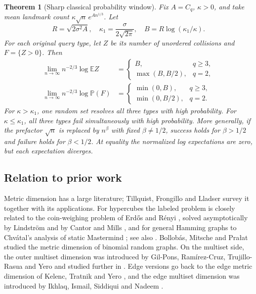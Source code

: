 \documentclass[11pt]{article}
\newtheorem{theorem}{Theorem}
\theoremstyle{definition}
\newcommand{\prob}{\mathbb P}
\newcommand{\ex}{\mathbb E}
\newcommand{\whp}{with high probability}
\begin{document}
\begin{theorem}[Sharp classical probability window]\label{thm:window}
Fix \(A=C_q\), \(\kappa>0\), and take mean landmark count \(\kappa\sqrt n\,e^{A n^{1/3}}\). Let
\[
R=\sqrt{2\sigma^2 A},\quad \kappa_1=\frac{\sigma}{2\sqrt{2\pi}},
\quad B=R\log(\kappa_1/\kappa).
\]
For each original query type, let \(Z\) be its number of unordered collisions and \(F=\{Z>0\}\). Then
\[
\begin{aligned}
\lim_{n\to\infty}n^{-2/3}\log\ex Z&=
\begin{cases}B,&q\ge3,\\ \max(B,B/2),&q=2,\end{cases}\\
\lim_{n\to\infty}n^{-2/3}\log\prob(F)&=
\begin{cases}\min(0,B),&q\ge3,\\ \min(0,B/2),&q=2.\end{cases}
\end{aligned}
\]
For \(\kappa>\kappa_1\), one random set resolves all three types \whp. For \(\kappa\le\kappa_1\), all three types fail simultaneously \whp. More generally, if the prefactor \(\sqrt n\) is replaced by \(n^\beta\) with fixed \(\beta\ne1/2\), success holds for \(\beta>1/2\) and failure holds for \(\beta<1/2\). At equality the normalized log expectations are zero, but each expectation diverges.
\end{theorem}


\subsection{Relation to prior work}
Metric dimension has a large literature; Tillquist, Frongillo and Lladser \cite{TFL} survey it together with its applications. For hypercubes the labeled problem is closely related to the coin-weighing problem of Erd\H{o}s and R\'enyi \cite{ER}, solved asymptotically by Lindstr\"om \cite{Lindstrom} and by Cantor and Mills \cite{CM}, and for general Hamming graphs to Chv\'atal's analysis of static Mastermind \cite{Chvatal}; see also \cite{Laird,KMSY}. Bollob\'as, Mitsche and Pra{\l}at \cite{BMP} studied the metric dimension of binomial random graphs. On the multiset side, the outer multiset dimension was introduced by Gil-Pons, Ram\'irez-Cruz, Trujillo-Rasua and Yero \cite{GRTY} and studied further in \cite{KKY}. Edge versions go back to the edge metric dimension of Kelenc, Tratnik and Yero \cite{KTY}, and the edge multiset dimension was introduced by Ikhlaq, Ismail, Siddiqui and Nadeem \cite{IISN}.
\end{document}
